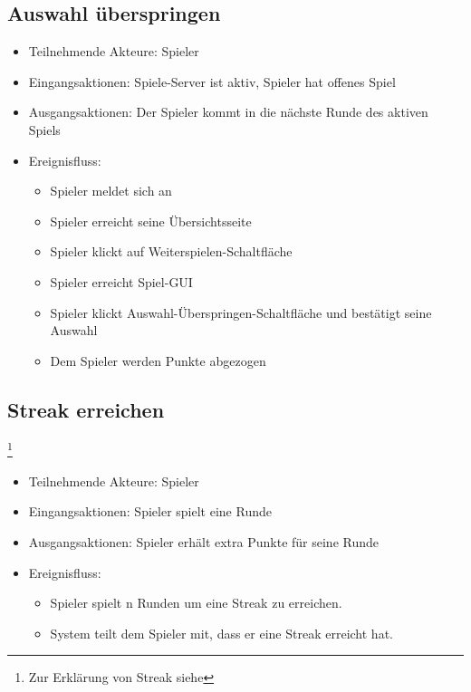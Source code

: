 \documentclass[a4paper]{scrreprt}
\begin{document}
	\subsection{Auswahl überspringen}
	\begin{itemize}
		\item Teilnehmende Akteure: \Gls{Spieler}
		\item Eingangsaktionen: Spiele-Server ist aktiv, Spieler hat offenes Spiel
        \item Ausgangsaktionen: Der Spieler kommt in die nächste Runde des aktiven Spiels
		\item Ereignisfluss:
		\begin{itemize}
			\item Spieler meldet sich an
			\item Spieler erreicht seine Übersichtsseite
			\item Spieler klickt auf Weiterspielen-Schaltfläche
			\item Spieler erreicht Spiel-GUI
			\item Spieler klickt Auswahl-Überspringen-Schaltfläche und bestätigt seine Auswahl
            \item Dem Spieler werden Punkte abgezogen
		\end{itemize}
	\end{itemize}
     
    \subsection{Streak erreichen}\footnote{Zur Erklärung von Streak siehe }
    \begin{itemize}
        \item Teilnehmende Akteure: \Gls{Spieler}
        \item Eingangsaktionen: Spieler spielt eine Runde
        \item Ausgangsaktionen: Spieler erhält extra Punkte für seine Runde
        \item Ereignisfluss:
        \begin{itemize}
            \item Spieler spielt n Runden um eine Streak zu erreichen. 
            \item System teilt dem Spieler mit, dass er eine Streak erreicht hat.
        \end{itemize}
    \end{itemize}
    
\newpage
\end{document}
